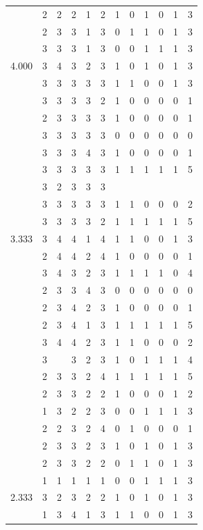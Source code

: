 \documentclass[]{book}
\theoremstyle{definition}
\theoremstyle{definition}
\theoremstyle{definition}
\theoremstyle{remark}
\begin{document}
\begin{table}
{\begin{tabular}[t]{rrrrrrrrrrrr}
 & 2 & 2 & 2 & 1 & 2 & 1 & 0 & 1 & 0 & 1 & 3\\
 & 2 & 3 & 3 & 1 & 3 & 0 & 1 & 1 & 0 & 1 & 3\\
 & 3 & 3 & 3 & 1 & 3 & 0 & 0 & 1 & 1 & 1 & 3\\
4.000 & 3 & 4 & 3 & 2 & 3 & 1 & 0 & 1 & 0 & 1 & 3\\
 & 3 & 3 & 3 & 3 & 3 & 1 & 1 & 0 & 0 & 1 & 3\\
 & 3 & 3 & 3 & 3 & 2 & 1 & 0 & 0 & 0 & 0 & 1\\
 & 2 & 3 & 3 & 3 & 3 & 1 & 0 & 0 & 0 & 0 & 1\\
 & 3 & 3 & 3 & 3 & 3 & 0 & 0 & 0 & 0 & 0 & 0\\
 & 3 & 3 & 3 & 4 & 3 & 1 & 0 & 0 & 0 & 0 & 1\\
 & 3 & 3 & 3 & 3 & 3 & 1 & 1 & 1 & 1 & 1 & 5\\
 & 3 & 2 & 3 & 3 & 3 &  &  &  &  &  & \\
 & 3 & 3 & 3 & 3 & 3 & 1 & 1 & 0 & 0 & 0 & 2\\
 & 3 & 3 & 3 & 3 & 2 & 1 & 1 & 1 & 1 & 1 & 5\\
3.333 & 3 & 4 & 4 & 1 & 4 & 1 & 1 & 0 & 0 & 1 & 3\\
 & 2 & 4 & 4 & 2 & 4 & 1 & 0 & 0 & 0 & 0 & 1\\
 & 3 & 4 & 3 & 2 & 3 & 1 & 1 & 1 & 1 & 0 & 4\\
 & 2 & 3 & 3 & 4 & 3 & 0 & 0 & 0 & 0 & 0 & 0\\
 & 2 & 3 & 4 & 2 & 3 & 1 & 0 & 0 & 0 & 0 & 1\\
 & 2 & 3 & 4 & 1 & 3 & 1 & 1 & 1 & 1 & 1 & 5\\
 & 3 & 4 & 4 & 2 & 3 & 1 & 1 & 0 & 0 & 0 & 2\\
 & 3 &  & 3 & 2 & 3 & 1 & 0 & 1 & 1 & 1 & 4\\
 & 2 & 3 & 3 & 2 & 4 & 1 & 1 & 1 & 1 & 1 & 5\\
 & 2 & 3 & 3 & 2 & 2 & 1 & 0 & 0 & 0 & 1 & 2\\
 & 1 & 3 & 2 & 2 & 3 & 0 & 0 & 1 & 1 & 1 & 3\\
 & 2 & 2 & 3 & 2 & 4 & 0 & 1 & 0 & 0 & 0 & 1\\
 & 2 & 3 & 3 & 2 & 3 & 1 & 0 & 1 & 0 & 1 & 3\\
 & 2 & 3 & 3 & 2 & 2 & 0 & 1 & 1 & 0 & 1 & 3\\
 & 1 & 1 & 1 & 1 & 1 & 0 & 0 & 1 & 1 & 1 & 3\\
2.333 & 3 & 2 & 3 & 2 & 2 & 1 & 0 & 1 & 0 & 1 & 3\\
 & 1 & 3 & 4 & 1 & 3 & 1 & 1 & 0 & 0 & 1 & 3\\

\end{tabular}}
\end{table}
\end{document}
